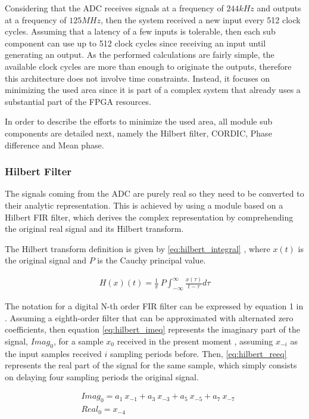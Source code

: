 Considering that the ADC receives signals at a frequency of $244 kHz$ and outputs at a frequency of $125MHz$, then the system received a new input every 512 clock cycles. Assuming that a latency of a few inputs is tolerable, then each sub component can use up to 512 clock cycles since receiving an input until generating an output. As the performed calculations are fairly simple, the available clock cycles are more than enough to originate the outputs, therefore this architecture does not involve time constraints. Instead, it focuses on minimizing the used area since it is part of a complex system that already uses a substantial part of the FPGA resources.

In order to describe the efforts to minimize the used area, all module sub components are detailed next, namely the Hilbert filter, CORDIC, Phase difference and Mean phase.

\subsubsection{Hilbert Filter}

The signals coming from the ADC are purely real so they need to be converted to their analytic representation. This is achieved by using a module based on a Hilbert FIR filter, which derives the complex representation by comprehending the original real signal and its Hilbert transform. 

The Hilbert transform definition is given by \ref{eq:hilbert_integral} \cite{hilbert-def}, where $x(t)$ is the original signal and $P$ is the Cauchy principal value.

\begin{eqnarray}
	H(x)(t) = \frac{1}{\pi} \ P \int_{-\infty}^{\infty}\frac{x(\tau)}{t-\tau}d\tau
	\label{eq:hilbert_integral}
\end{eqnarray}

The notation for a digital N-th order FIR filter can be expressed by equation 1 in \cite{hilbert-fpga}. Assuming a eighth-order filter that can be approximated with alternated zero coefficients, then equation \ref{eq:hilbert_imeq} represents the imaginary part of the signal, $Imag_0$, for a sample $x_{0}$ received in the present moment , assuming $x_{-i}$ as the input samples received $i$ sampling periods before. Then, \ref{eq:hilbert_reeq} represents the real part of the signal for the same sample, which simply consists on delaying four sampling periods the original signal.

\begin{eqnarray}
&Imag_0 = a_{1} \ x_{-1} +a_{3} \ x_{-3} + a_{5} \ x_{-5} + a_{7} \ x_{-7} \\
\label{eq:hilbert_imeq}
&Real_0 = x_{-4} 
\label{eq:hilbert_reeq}
\end{eqnarray}


